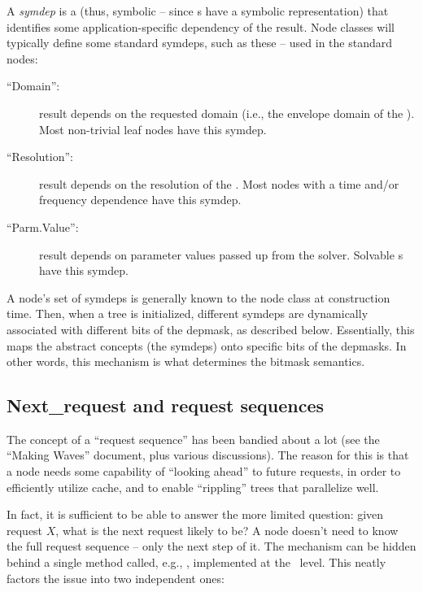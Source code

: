  A {\em symdep} is a  (thus, symbolic -- since s have a
  symbolic representation) that identifies some application-specific dependency
  of the result. Node classes will typically define some standard symdeps, such
  as these -- used in the standard nodes:

  \begin{description}
  
  \item[``Domain'':] result depends on the requested domain (i.e., the envelope
    domain of the \Cells). Most non-trivial leaf nodes have this symdep.

  \item[``Resolution'':] result depends on the resolution of the \Cells. Most
    nodes with a time and/or frequency dependence have this symdep.
   
  \item[``Parm.Value'':] result depends on parameter values passed up from the
    solver. Solvable \Parm{}s have this symdep.
  
  \end{description}
  
  A node's set of symdeps is generally known to the node class at construction
  time. Then, when a tree is initialized, different symdeps are dynamically
  associated with different bits of the depmask, as described below.
  Essentially, this maps the abstract concepts (the symdeps) onto specific bits
  of the depmasks. In other words, this mechanism is what determines the
  bitmask semantics.



\subsection{Next\_request and request sequences}

  The concept of a ``request sequence'' has been bandied about a lot (see the
  ``Making Waves'' document, plus various discussions). The reason for this is
  that a node needs some capability of ``looking ahead'' to future requests, in
  order to efficiently utilize cache, and to enable ``rippling'' trees that
  parallelize well.

  In fact, it is sufficient to be able to answer the more limited question:
  given request $X$, what is the next request likely to be? A node doesn't 
  need to know the full request sequence -- only the next step of it. The
  mechanism can be hidden behind a single method called, e.g.,
  , implemented at the \Node\ level. This neatly
  factors the issue into two independent ones:

